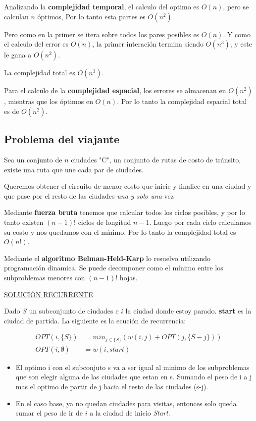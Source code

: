 \documentclass{article}
\begin{document}
Analizando la \textbf{complejidad temporal}, el calculo del optimo es \(O(n)\), pero se calculan \(n\) óptimos,
Por lo tanto esta partes es \(O(n^2)\).

Pero como en la primer se itera sobre todos los pares posibles es \(O(n)\). Y como el calculo del error
es \(O(n)\), la primer interación termina siendo \(O(n^3)\), y este le gana a \(O(n^2)\).

La complejidad total es \(O(n^3)\).

Para el calculo de la \textbf{complejidad espacial}, los errores se almacenan en \(O(n^2)\), mientras que 
los óptimos en \(O(n)\). Por lo tanto la complejidad espacial total es de \(O(n^2)\).

\newpage
\subsection{Problema del viajante}

Sea un conjunto de \(n\) ciudades "C", un conjunto de rutas de costo de tránsito, existe una ruta 
que une cada par de ciudades.

Queremos obtener el circuito de menor costo que inicie y finalice en una ciudad y
que pase por el resto de las ciudades \textit{una y solo una} vez

Mediante \textbf{fuerza bruta} tenemos que calcular todos los ciclos posibles, y por lo tanto
existen \((n-1)!\) ciclos de longitud \(n-1\). 
Luego por cada ciclo calculamos su costo y nos quedamos con el mínimo. Por lo tanto la complejidad total es \(O(n!)\).

Mediante el \textbf{algoritmo Belman-Held-Karp} lo resuelvo utilizando programación dinamica.
Se puede decomponer como el mínimo entre los subproblemas menores con \((n-1)!\) hojas.

\noindent
\underline{SOLUCIÓN RECURRENTE}

Dado \(S\) un subconjunto de ciudades e \(i\) la ciudad donde estoy parado. \textbf{start} es la ciudad de partida.
La siguiente es la ecución de recurrencia:

\begin{align*}
    OPT(i, \{S\}) &= min_{j \in \{S\}} (w(i,j) + OPT(j, \{S-j\})) \\ 
    OPT(i, \emptyset) &= w(i, start)
\end{align*}

\begin{itemize}
    \item El optimo i con el subconjuto s va a ser igual al minimo de los subproblemas que son elegir alguna de las ciudades que estan en s. 
          Sumando el peso de i a j mas el optimo de partir de j hacia el resto de las ciudades (s-j).
    \item En el caso base, ya no quedan ciudades para visitas, entonces solo queda sumar el peso de ir de \(i\) a la ciudad de inicio \textit{Start}.
\end{itemize}
    
\end{document}
